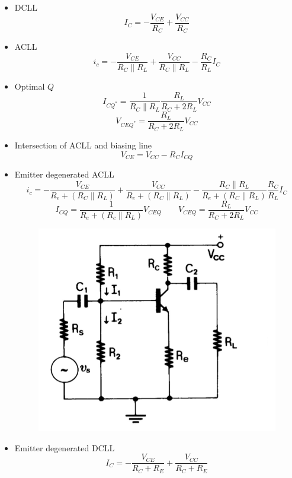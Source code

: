 \documentclass{article}
\begin{document}
\begin{itemize}
	\item DCLL \[I_{C}=-\frac{V_{CE}}{R_{C}}+\frac{V_{CC}}{R_{C}}\]
	\item ACLL \[i_{c}=-\frac{V_{CE}}{R_{C}\parallel R_{L}}+\frac{V_{CC}}{R_{C}\parallel R_{L}}-\frac{R_{C}}{R_{L}}I_{C}\]
	\item Optimal $Q$ \[I_{CQ^{*}}=\frac{1}{R_{C}\parallel R_{L}}\frac{R_{L}}{R_{C}+2R_{L}}V_{CC}\] \[V_{CEQ^{*}}=\frac{R_{L}}{R_{C}+2R_{L}}V_{CC}\]
	\item Intersection of ACLL and biasing line \[V_{CE}=V_{CC}-R_{C}I_{CQ}\]
	\item Emitter degenerated ACLL \[i_{c}=-\frac{V_{CE}}{R_{e}+(R_{C}\parallel R_{L})}+\frac{V_{CC}}{R_{e}+(R_{C}\parallel R_{L})}-\frac{R_{C}\parallel R_{L}}{R_{e}+(R_{C}\parallel R_{L})}\frac{R_{C}}{R_{L}}I_{C}\] \[I_{CQ}=\frac{1}{R_{e}+(R_{c}\parallel R_{L})}V_{CEQ} \quad \quad V_{CEQ}=\frac{R_{L}}{R_{C}+2R_{L}}V_{CC}\]
\begin{figure}[H]\centering
\includegraphics[width=.3\textwidth]{acll_re}
\end{figure}
	\item Emitter degenerated DCLL \[I_{C}=-\frac{V_{CE}}{R_{C}+R_{E}}+\frac{V_{CC}}{R_{C}+R_{E}}\]
\end{itemize}



\vspace*{\fill}
\end{document}
